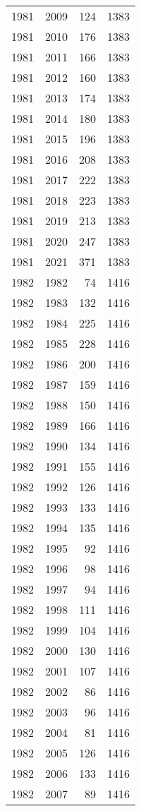 \documentclass[
  11pt,
  letterpaper,
  DIV=11,
  numbers=noendperiod,
  twoside]{scrartcl}
\begin{document}
\begin{longtable}[]{@{}rrrr@{}}
1981 & 2009 & 124 & 1383 \\
1981 & 2010 & 176 & 1383 \\
1981 & 2011 & 166 & 1383 \\
1981 & 2012 & 160 & 1383 \\
1981 & 2013 & 174 & 1383 \\
1981 & 2014 & 180 & 1383 \\
1981 & 2015 & 196 & 1383 \\
1981 & 2016 & 208 & 1383 \\
1981 & 2017 & 222 & 1383 \\
1981 & 2018 & 223 & 1383 \\
1981 & 2019 & 213 & 1383 \\
1981 & 2020 & 247 & 1383 \\
1981 & 2021 & 371 & 1383 \\
1982 & 1982 & 74 & 1416 \\
1982 & 1983 & 132 & 1416 \\
1982 & 1984 & 225 & 1416 \\
1982 & 1985 & 228 & 1416 \\
1982 & 1986 & 200 & 1416 \\
1982 & 1987 & 159 & 1416 \\
1982 & 1988 & 150 & 1416 \\
1982 & 1989 & 166 & 1416 \\
1982 & 1990 & 134 & 1416 \\
1982 & 1991 & 155 & 1416 \\
1982 & 1992 & 126 & 1416 \\
1982 & 1993 & 133 & 1416 \\
1982 & 1994 & 135 & 1416 \\
1982 & 1995 & 92 & 1416 \\
1982 & 1996 & 98 & 1416 \\
1982 & 1997 & 94 & 1416 \\
1982 & 1998 & 111 & 1416 \\
1982 & 1999 & 104 & 1416 \\
1982 & 2000 & 130 & 1416 \\
1982 & 2001 & 107 & 1416 \\
1982 & 2002 & 86 & 1416 \\
1982 & 2003 & 96 & 1416 \\
1982 & 2004 & 81 & 1416 \\
1982 & 2005 & 126 & 1416 \\
1982 & 2006 & 133 & 1416 \\
1982 & 2007 & 89 & 1416 \\

\end{longtable}
\end{document}
